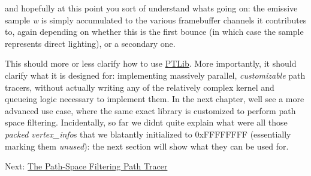  \begin{DoxyParagraph}{}
and hopefully at this point you sort of understand what\textquotesingle{}s going on\+: the emissive sample {\itshape w} is simply accumulated to the various framebuffer channels it contributes to, again depending on whether this is the first bounce (in which case the sample represents direct lighting), or a secondary one.
\end{DoxyParagraph}
\begin{DoxyParagraph}{}
This should more or less clarify how to use \hyperlink{group___p_t_lib}{P\+T\+Lib}. More importantly, it should clarify what it is designed for\+: implementing massively parallel, {\itshape customizable} path tracers, without actually writing any of the relatively complex kernel and queueing logic necessary to implement them. In the next chapter, we\textquotesingle{}ll see a more advanced use case, where the same exact library is customized to perform path space filtering. Incidentally, so far we didn\textquotesingle{}t quite explain what were all those {\itshape packed vertex\+\_\+info}\textquotesingle{}s that we blatantly initialized to 0x\+F\+F\+F\+F\+F\+F\+FF (essentially marking them {\itshape unused})\+: the next section will show what they can be used for.
\end{DoxyParagraph}
Next\+: \hyperlink{_p_s_f_p_t_page}{The Path-\/\+Space Filtering Path Tracer} 
